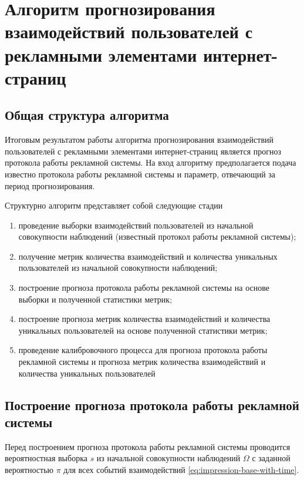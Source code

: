 \section{Алгоритм прогнозирования взаимодействий пользователей с рекламными элементами интернет-страниц}
\subsection{Общая структура алгоритма}
Итоговым результатом работы алгоритма прогнозирования взаимодействий пользователей с рекламными элементами
интернет-страниц является прогноз протокола работы рекламной системы. На вход алгоритму предполагается
подача известно протокола работы рекламной системы и параметр, отвечающий за период прогнозирования.

Структурно алгоритм представляет собой следующие стадии
\begin{enumerate}
    \item проведение выборки взаимодействий пользователей из начальной совокупности наблюдений (известный протокол
    работы рекламной системы);
    \item получение метрик количества взаимодействий и количества уникальных пользователей из начальной совокупности 
    наблюдений;
    \item построение прогноза протокола работы рекламной системы на основе выборки и полученной статистики метрик;
    \item построение прогноза метрик количества взаимодействий и количества уникальных пользователей на основе 
    полученной статистики метрик;
    \item проведение калибровочного процесса для прогноза протокола работы рекламной системы и прогноза метрик количества
    взаимодействий и количества уникальных пользователей
\end{enumerate}

\subsection{Построение прогноза протокола работы рекламной системы}
Перед построением прогноза протокола работы рекламной системы проводится вероятностная выборка $s$ из начальной совокупности 
наблюдений $\Omega$ с заданной вероятностью $\pi$ для всех событий взаимодействий \eqref{eq:impression-base-with-time}.

